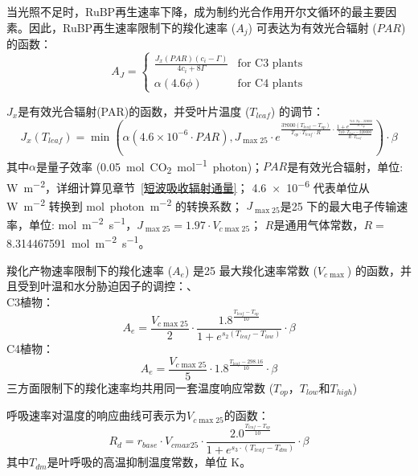当光照不足时，RuBP再生速率下降，成为制约光合作用开尔文循环的最主要因素。因此，RuBP再生速率限制下的羧化速率 ($A_j$) 可表达为有效光合辐射 ($PAR$) 的函数：
\begin{equation}\label{A_J1}
A_{J}=\begin{cases}\frac{J_x\left(PAR\right)\left(c_{i}-\Gamma\right)}{4c_{i}+8\Gamma}
     & \text{for C3 plants} \\
\alpha\left(4.6\phi\right) & \text{for C4 plants}
\end{cases}
\end{equation}

$J_x$是有效光合辐射(PAR)的函数，并受叶片温度 ($T_{leaf}$) 的调节：
\begin{equation}
J_{x}\left(T_{{leaf }}\right)=\min \left(\alpha\left(4.6 \times 10^{-6} \cdot PAR\right), J_{\max 25}
 \cdot e^{\frac{37000\left(T_{{leaf }}-T_{o p}\right)}{T_{o p} \cdot T_{{leaf }} \cdot R} \cdot \frac{1+e^{\frac{710 \cdot T_{o p}-220000}
 {R \cdot T_{o p}}}}{\frac{710 \cdot T_{{leaf }}-220000}{R \cdot T_{{leaf }}}}}\right) \cdot \beta
\end{equation}
其中$\alpha$是量子效率 (\qty{0.05}{mol.CO_2.mol^{-1}.photon})；$PAR$是有效光合辐射，单位: \unit{W.m^{-2}}，详细计算见章节~\ref{短波吸收辐射通量}；
\num{4.6e-6} 代表单位从 \unit{W.m^{-2}} 转换到 \unit{mol.photon.m^{-2}} 的转换系数；
$J_{\max 25}$是25 \textcelsius 下的最大电子传输速率，单位: \unit{mol.m^{-2}.s^{-1}}，$J_{\max 25}=1.97 \cdot V_{c \max 25}$； 
$R$是通用气体常数，$R=$ \qty{8.314467591}{mol.m^{-2}.s^{-1}}。

羧化产物速率限制下的羧化速率 ($A_e$) 是25 \textcelsius 最大羧化速率常数 ($V_{c \max}$) 的函数，并且受到叶温和水分胁迫因子的调控：、\\
C3植物：\\
\begin{equation}\label{A_e_a}
A_e=\frac{V_{c \max 25}}{2} \cdot \frac{1.8^{\frac{T_{{leaf }}-T_{o p}}{10}}}{1+e^{s_{2}\left(T_{{leaf }}-T_{{low }}\right)}} \cdot \beta
\end{equation}
C4植物：\\
\begin{equation}\label{A_e_b}
A_e=\frac{V_{c \max 25}}{5} \cdot 1.8^{\frac{T_{{leaf }}-298.16}{10}} \cdot \beta
\end{equation}
三方面限制下的羧化速率均共用同一套温度响应常数 ($T_{op}$，$T_{low}$和$T_{high}$)


呼吸速率对温度的响应曲线可表示为$V_{c \max25}$的函数：
\begin{equation}\label{R_d1}
R_{d}=r_{{base }} \cdot V_{cmax 25} \cdot \frac{2.0^{\frac{T_{leaf}-T_{op}}{10}}}{1+e^{s_3 \cdot\left(T_{leaf}-T_{d m}\right)}} \cdot \beta
\end{equation}
其中$T_{dm}$是叶呼吸的高温抑制温度常数，单位 K。



